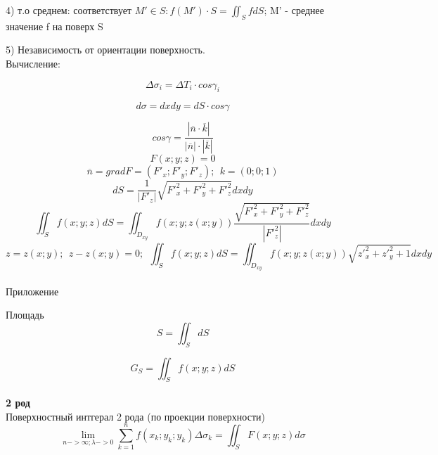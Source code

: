 \documentclass{article}
\begin{document}
4) т.о среднем: соответствует $M'\in S: f(M')\cdot S = \iint_S fdS$; M' - среднее значение f на поверх S

5) Независимость от ориентации поверхность.
\\
Вычисление:

\begin{equation*}
    \Delta \sigma_i = \Delta T_i \cdot cos\gamma_i
\end{equation*}

\begin{equation*}
    d\sigma = dxdy = dS\cdot cos\gamma
\end{equation*}

\begin{equation*}
    cos\gamma = \frac{|\overline{n}\cdot \overline{k}|}{|\overline{n}|\cdot |\overline{k}|}
\end{equation*}
\begin{equation*}
    F(x;y;z) = 0 
\end{equation*}
\begin{equation*}
    \overline{n} = gradF = (F'_x; F'_y; F'_z); \ \ k =(0;0;1)
\end{equation*}
\begin{equation*}
    dS = \frac{1}{|F'_z|}\sqrt{F'^2_x+F'^2_y+F'^2_z}dxdy
\end{equation*}
\begin{equation*}
    \iint_S f(x;y;z)dS = \iint_{D_{xy}}f(x;y;z(x;y))\frac{\sqrt{F'^2_x+F'^2_y+F'^2_z}}{|F'^2_z|}dxdy
\end{equation*}
\begin{equation*}
    z = z(x;y);\ \ z - z(x;y) = 0; \ \ \iint_S f(x;y;z)dS = \iint_{D_{xy}}f(x;y;z(x;y))\sqrt{z'^2_x+z'^2_y+1}dxdy
\end{equation*}
\\
Приложение 

Площадь
\begin{equation*}
    S = \iint_S dS 
\end{equation*}

\begin{equation*}
    G_S = \iint_S f(x;y;z)dS 
\end{equation*}
\\ 
\textbf{2 род}
\\
Поверхностный интгерал 2 рода (по проекции поверхности)
\begin{equation*}
    \lim_{n->\infty; \lambda-> 0}\sum_{k=1}^{n}f(x_k;y_k;y_k)\Delta \sigma_k = \iint_S F(x;y;z)d\sigma
\end{equation*}
\end{document}

